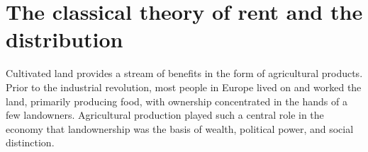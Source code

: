  
\section{The classical theory of rent and the distribution}
Cultivated land provides a stream of benefits in the form of agricultural products.
Prior to the industrial revolution, most people in Europe lived on and worked the land, primarily producing food, with ownership concentrated in the hands of a few landowners.  Agricultural production played such a central role in the economy that landownership was the basis of wealth, political power, and social distinction.   

